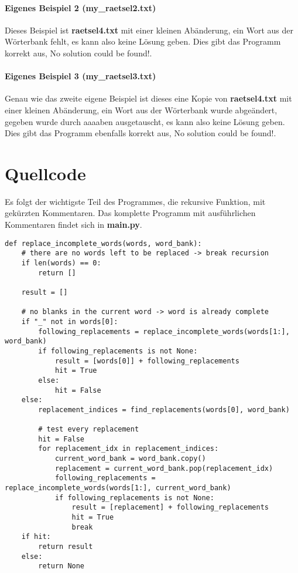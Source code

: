 \documentclass[a4paper,10pt,ngerman]{scrartcl}
\begin{document}
\paragraph{Eigenes Beispiel 2 (my\_raetsel2.txt)}
Dieses Beispiel ist \textbf{raetsel4.txt} mit einer kleinen Abänderung, ein Wort aus der Wörterbank fehlt, es kann also keine Lösung geben. Dies gibt das Programm korrekt aus, \glqq No solution could be found!\grqq{}.

\paragraph{Eigenes Beispiel 3 (my\_raetsel3.txt)}
Genau wie das zweite eigene Beispiel ist dieses eine Kopie von \textbf{raetsel4.txt} mit einer kleinen Abänderung, ein Wort aus der Wörterbank wurde abgeändert, \glqq gegeben\grqq{} wurde durch \glqq aaaaben\grqq{} ausgetauscht, es kann also keine Lösung geben. Dies gibt das Programm ebenfalls korrekt aus, \glqq No solution could be found!\grqq{}.

\section{Quellcode}

Es folgt der wichtigste Teil des Programmes, die rekursive Funktion, mit gekürzten Kommentaren. Das komplette Programm mit ausführlichen Kommentaren findet sich in \textbf{main.py}.
\begin{lstlisting}
def replace_incomplete_words(words, word_bank):
    # there are no words left to be replaced -> break recursion
    if len(words) == 0:
        return []

    result = []

    # no blanks in the current word -> word is already complete
    if "_" not in words[0]:
        following_replacements = replace_incomplete_words(words[1:], word_bank)
        if following_replacements is not None:
            result = [words[0]] + following_replacements
            hit = True
        else:
            hit = False
    else:
        replacement_indices = find_replacements(words[0], word_bank)

        # test every replacement
        hit = False
        for replacement_idx in replacement_indices:
            current_word_bank = word_bank.copy()
            replacement = current_word_bank.pop(replacement_idx)
            following_replacements = replace_incomplete_words(words[1:], current_word_bank)
            if following_replacements is not None:
                result = [replacement] + following_replacements
                hit = True
                break
    if hit:
        return result
    else:
        return None
\end{lstlisting}
\end{document}
